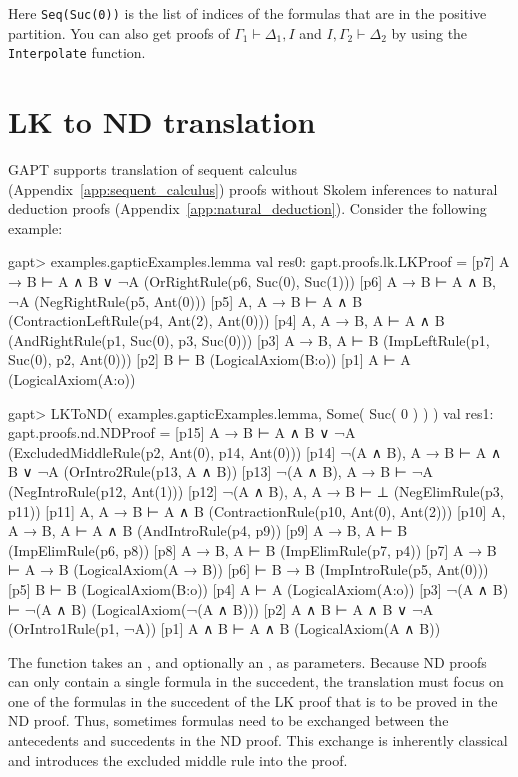 \documentclass[a4paper,11pt]{book}
\newcommand{\cli}[1]{{\ttfamily {#1}}}
\begin{document}
Here \texttt{Seq(Suc(0))} is the list of indices of the formulas that are in
the positive partition.  You can also get proofs of $\Gamma_1 \vdash \Delta_1,
  I$ and $I, \Gamma_2 \vdash \Delta_2$ by using the \texttt{Interpolate}
function.

\section{LK to ND translation}

GAPT supports translation of sequent calculus
(Appendix~\ref{app:sequent_calculus}) proofs without Skolem inferences
to natural deduction proofs (Appendix~\ref{app:natural_deduction}).
Consider the following example:
\begin{clilisting}
  gapt> examples.gapticExamples.lemma
  val res0: gapt.proofs.lk.LKProof = [p7] A → B ⊢ A ∧ B ∨ ¬A    (OrRightRule(p6, Suc(0), Suc(1)))
  [p6] A → B ⊢ A ∧ B, ¬A    (NegRightRule(p5, Ant(0)))
  [p5] A, A → B ⊢ A ∧ B    (ContractionLeftRule(p4, Ant(2), Ant(0)))
  [p4] A, A → B, A ⊢ A ∧ B    (AndRightRule(p1, Suc(0), p3, Suc(0)))
  [p3] A → B, A ⊢ B    (ImpLeftRule(p1, Suc(0), p2, Ant(0)))
  [p2] B ⊢ B    (LogicalAxiom(B:o))
  [p1] A ⊢ A    (LogicalAxiom(A:o))

  gapt> LKToND( examples.gapticExamples.lemma, Some( Suc( 0 ) ) )
  val res1: gapt.proofs.nd.NDProof = [p15] A → B ⊢ A ∧ B ∨ ¬A    (ExcludedMiddleRule(p2, Ant(0), p14, Ant(0)))
  [p14] ¬(A ∧ B), A → B ⊢ A ∧ B ∨ ¬A    (OrIntro2Rule(p13, A ∧ B))
  [p13] ¬(A ∧ B), A → B ⊢ ¬A    (NegIntroRule(p12, Ant(1)))
  [p12] ¬(A ∧ B), A, A → B ⊢ ⊥    (NegElimRule(p3, p11))
  [p11] A, A → B ⊢ A ∧ B    (ContractionRule(p10, Ant(0), Ant(2)))
  [p10] A, A → B, A ⊢ A ∧ B    (AndIntroRule(p4, p9))
  [p9] A → B, A ⊢ B    (ImpElimRule(p6, p8))
  [p8] A → B, A ⊢ B    (ImpElimRule(p7, p4))
  [p7] A → B ⊢ A → B    (LogicalAxiom(A → B))
  [p6]  ⊢ B → B    (ImpIntroRule(p5, Ant(0)))
  [p5] B ⊢ B    (LogicalAxiom(B:o))
  [p4] A ⊢ A    (LogicalAxiom(A:o))
  [p3] ¬(A ∧ B) ⊢ ¬(A ∧ B)    (LogicalAxiom(¬(A ∧ B)))
  [p2] A ∧ B ⊢ A ∧ B ∨ ¬A    (OrIntro1Rule(p1, ¬A))
  [p1] A ∧ B ⊢ A ∧ B    (LogicalAxiom(A ∧ B))

\end{clilisting}
The \cli{LKToND} function takes an \cli{LKProof}, and optionally an
\cli{Option[SequentIndex]}, as parameters.  Because ND proofs can only
contain a single formula in the succedent, the translation must focus on one
of the formulas in the succedent of the LK proof that is to be proved in the ND
proof.
Thus, sometimes formulas need to be exchanged between the antecedents and
succedents in the ND proof. This exchange is inherently classical and introduces
the excluded middle rule into the proof.
\end{document}
